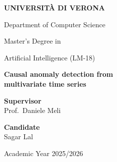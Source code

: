 \begin{titlepage}
\centering
\vspace*{1cm}

{\LARGE\bfseries UNIVERSIT\`A DI VERONA\par}
\vspace{1.2cm}

{\large Department of Computer Science\par}
\vspace{0.8cm}

{\normalsize Master's Degree in\par}
\vspace{0.3cm}
{\large Artificial Intelligence (LM-18)\par}

\vspace{3.4cm}

{\LARGE\bfseries
Causal anomaly detection from\\[0.35em]
multivariate time series\par}

\vspace{3cm}

\begin{minipage}[t]{0.45\textwidth}
  \raggedright
  \textbf{Supervisor}\\[0.4em]
  Prof.\ Daniele Meli
\end{minipage}
\hfill
\begin{minipage}[t]{0.45\textwidth}
  \raggedleft
  \textbf{Candidate}\\[0.4em]
  Sagar Lal
\end{minipage}

\vfill
{\normalsize Academic Year 2025/2026\par}
\vspace{1cm}
\end{titlepage}
